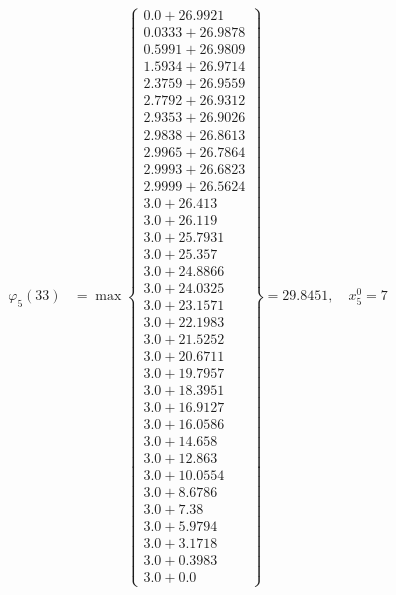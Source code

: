 \documentclass{article}
\begin{document}
\begin{align*}
\varphi_{5}(33) &= \max \left\{ \begin{array}{c}
0.0 + 26.9921 \\
 0.0333 + 26.9878 \\
 0.5991 + 26.9809 \\
 1.5934 + 26.9714 \\
 2.3759 + 26.9559 \\
 2.7792 + 26.9312 \\
 2.9353 + 26.9026 \\
 2.9838 + 26.8613 \\
 2.9965 + 26.7864 \\
 2.9993 + 26.6823 \\
 2.9999 + 26.5624 \\
 3.0 + 26.413 \\
 3.0 + 26.119 \\
 3.0 + 25.7931 \\
 3.0 + 25.357 \\
 3.0 + 24.8866 \\
 3.0 + 24.0325 \\
 3.0 + 23.1571 \\
 3.0 + 22.1983 \\
 3.0 + 21.5252 \\
 3.0 + 20.6711 \\
 3.0 + 19.7957 \\
 3.0 + 18.3951 \\
 3.0 + 16.9127 \\
 3.0 + 16.0586 \\
 3.0 + 14.658 \\
 3.0 + 12.863 \\
 3.0 + 10.0554 \\
 3.0 + 8.6786 \\
 3.0 + 7.38 \\
 3.0 + 5.9794 \\
 3.0 + 3.1718 \\
 3.0 + 0.3983 \\
 3.0 + 0.0
\end{array} \right\}=29.8451, \quad x_{5}^0=7\\
  

\end{align*}
\end{document}
